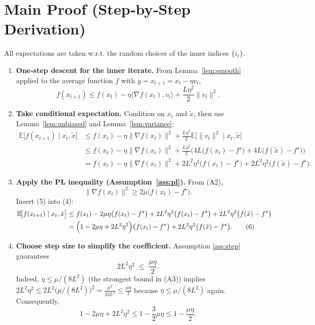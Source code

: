 \documentclass{article}
\newcommand{\E}{\mathbb{E}}
\begin{document}
\section*{Main Proof (Step‑by‑Step Derivation)}
All expectations are taken w.r.t. the random choices of the inner indices $\{i_t\}$.

\begin{enumerate}[label=[Step \arabic*], leftmargin=*]
\item \textbf{One‑step descent for the inner iterate.}  
From Lemma~\ref{lem:smooth} applied to the average function $f$ with $y=x_{t+1}=x_t-\eta v_t$,
\[
f(x_{t+1})\le f(x_t)-\eta\langle\nabla f(x_t),v_t\rangle+\frac{L\eta^{2}}{2}\|v_t\|^{2}.
\tag{3}
\]

\item \textbf{Take conditional expectation.}  
Condition on $x_t$ and $\tilde{x}$, then use Lemma~\ref{lem:unbiased} and Lemma~\ref{lem:variance}:
\[
\begin{aligned}
\E\!\bigl[f(x_{t+1})\mid x_t,\tilde{x}\bigr]
&\le f(x_t)-\eta\|\nabla f(x_t)\|^{2}
   +\frac{L\eta^{2}}{2}\E\!\bigl[\|v_t\|^{2}\mid x_t,\tilde{x}\bigr]\\
&\le f(x_t)-\eta\|\nabla f(x_t)\|^{2}
   +\frac{L\eta^{2}}{2}\bigl(4L\!\bigl(f(x_t)-f^{\star}\bigr)
          +4L\!\bigl(f(\tilde{x})-f^{\star}\bigr)\bigr)\\
&= f(x_t)-\eta\|\nabla f(x_t)\|^{2}
   +2L^{2}\eta^{2}\bigl(f(x_t)-f^{\star}\bigr)
   +2L^{2}\eta^{2}\bigl(f(\tilde{x})-f^{\star}\bigr).
\tag{4}
\end{aligned}
\]

\item \textbf{Apply the PL inequality (Assumption~\ref{ass:pl}).}  
From (A2),
\[
\|\nabla f(x_t)\|^{2}\ge 2\mu\bigl(f(x_t)-f^{\star}\bigr).
\tag{5}
\]
Insert (5) into (4):
\[
\begin{aligned}
\E\!\bigl[f(x_{t+1})\mid x_t,\tilde{x}\bigr]
&\le f(x_t)-2\mu\eta\bigl(f(x_t)-f^{\star}\bigr)
   +2L^{2}\eta^{2}\bigl(f(x_t)-f^{\star}\bigr)
   +2L^{2}\eta^{2}\bigl(f(\tilde{x})-f^{\star}\bigr)\\
&= \Bigl(1-2\mu\eta+2L^{2}\eta^{2}\Bigr)\bigl(f(x_t)-f^{\star}\bigr)
   +2L^{2}\eta^{2}\bigl(f(\tilde{x})-f^{\star}\bigr).
\tag{6}
\end{aligned}
\]

\item \textbf{Choose step size to simplify the coefficient.}  
Assumption \ref{ass:step} guarantees
\[
2L^{2}\eta^{2}\;\le\;\frac{\mu\eta}{2}.
\tag{7}
\]
Indeed, $\eta\le\mu/(8L^{2})$ (the strongest bound in (A3)) implies
$2L^{2}\eta^{2}\le 2L^{2}\bigl(\mu/(8L^{2})\bigr)^{2}
= \frac{\mu^{2}}{32L^{2}}\le\frac{\mu\eta}{2}$ because $\eta\le\mu/(8L^{2})$ again.
Consequently,
\[
1-2\mu\eta+2L^{2}\eta^{2}
\le 1-\frac{3}{2}\mu\eta
\le 1-\frac{\mu\eta}{2}.
\tag{8}
\]


\end{enumerate}
\end{document}
